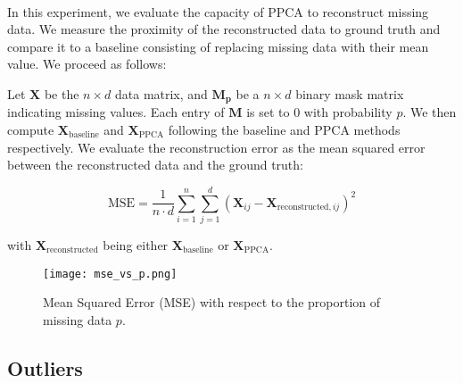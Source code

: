 \documentclass{article}
\begin{document}
\paragraph{} In this experiment, we evaluate the capacity of PPCA to reconstruct missing data. We measure the proximity of the reconstructed data to ground truth and compare it to %
a baseline consisting of replacing missing data with their mean value. We proceed as follows:




Let $\mathbf{X}$ be the $n \times d$ data matrix, and $\mathbf{M_p}$ be a $n \times d$ binary mask matrix indicating missing values. Each entry of $\mathbf{M}$ is set to $0$ with probability $p$. We then compute $\mathbf{X}_{\text{baseline}}$ and $\mathbf{X}_{\text{PPCA}}$ following the baseline and PPCA methods respectively. We evaluate the reconstruction error as the mean squared error between the reconstructed data and the ground truth:

\begin{equation}
    \label{eq:missing_data_error}
    \text{MSE} = \frac{1}{n \cdot d} \sum_{i=1}^n \sum_{j=1}^d \left(\mathbf{X}_{ij} - \mathbf{X}_{\text{reconstructed},ij}\right)^2
\end{equation}

with $\mathbf{X}_{\text{reconstructed}}$ being either $\mathbf{X}_{\text{baseline}}$ or $\mathbf{X}_{\text{PPCA}}$.

\begin{figure}[h]
    \centering
    \texttt{[image: mse\_vs\_p.png]}
    \caption{Mean Squared Error (MSE) with respect to the proportion of missing data $p$.}
    \label{fig:mse_vs_p}
\end{figure}

\subsection{Outliers}
\end{document}
